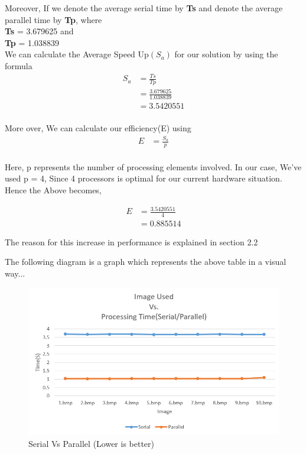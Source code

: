 \documentclass[paper=a4, fontsize=11pt]{scrartcl} %
\numberwithin{equation}{section} %
\numberwithin{figure}{section} %
\numberwithin{table}{section} %
\begin{document}
Moreover, If we denote the average serial time by \textbf{Ts} and denote the average parallel time by \textbf{Tp}, where \\
\textbf{Ts} = 3.679625 and \\
\textbf{Tp} = 1.038839 \\
We can calculate the Average Speed Up$(S_a)$ for our solution by using the formula
\begin{equation}
\begin{split}
S_a &= \frac{Ts}{Tp}  \\
	&=\frac{3.679625}{1.038839}  \\
	&=3.5420551
\end{split}
\end{equation}\\
More over, We can calculate our efficiency(E) using 
\begin{equation}
\begin{split}
E &= \frac{S_a}{p}
\end{split}
\end{equation}\\
Here, p represents the number of processing elements involved. In our case, We've used p = 4, Since 4 processors is optimal for our current hardware situation. Hence the Above becomes,

\begin{equation}
\begin{split}
E &= \frac{3.5420551}{4}\\
	&= 0.885514
\end{split}
\end{equation}


The reason for this increase in performance is explained in section 2.2


The following diagram is a graph which represents the above table in a visual way...


\begin{figure}[H]
	\centering
	\includegraphics[scale=0.5]{"graph2"}
	\caption{Serial Vs Parallel (Lower is better)}
        \label{graph1}
\end{figure}
\end{document}
